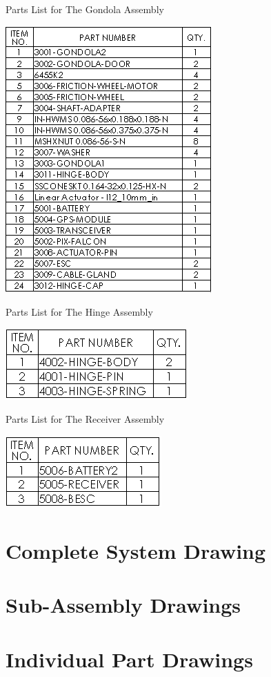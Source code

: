 \documentclass[../main.tex]{subfiles}
\begin{document}
	\begin{table}[H]
		\centering
		\caption{Parts List for The Gondola Assembly}
		\includegraphics[width=.5\linewidth]{img/dwgs/gondolaAsm.PNG}
		\label{fig:gondolaParts}
	\end{table}

	\begin{table}[H]
		\centering
		\caption{Parts List for The Hinge Assembly}
		\includegraphics[width=.4\linewidth]{img/dwgs/hingeAsm.PNG}
		\label{fig:hingeParts}
	\end{table}

	\begin{table}[H]
		\centering
		\caption{Parts List for The Receiver Assembly}
		\includegraphics[width=.35\linewidth]{img/dwgs/receiverAsm.PNG}
		\label{fig:recieverParts}
	\end{table}

	
	\pagebreak
	\largesection
		\begin{landscape}
			\section{Complete System Drawing}
			
\pagebreak
	\section{Sub-Assembly Drawings}
			

\pagebreak
	\section{Individual Part Drawings}
				
		\end{landscape}
	
	\stdsection
\end{document}
